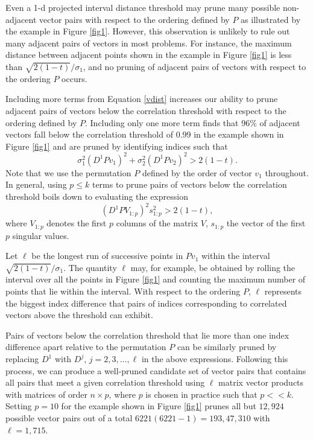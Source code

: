 \documentclass{article}
\numberwithin{algorithmctr}{section}
\begin{document}
Even a 1-d projected interval distance threshold may prune many possible
non-adjacent vector pairs with respect to the ordering defined by $P$ as
illustrated by the example in Figure \ref{fig1}.  However, this observation is
unlikely to rule out many adjacent pairs of vectors in most problems.  For
instance, the maximum distance between adjacent points shown in the example in
Figure \ref{fig1} is less than $\sqrt{2(1-t)}/\sigma_1$, and no pruning of
adjacent pairs of vectors with respect to the ordering $P$ occurs.

Including more terms from Equation \ref{vdist} increases our ability to prune
adjacent pairs of vectors below the correlation threshold with respect to the
ordering defined by $P$.  Including only one more term finds that 96\% of
adjacent vectors fall below the correlation threshold of $0.99$ in the
example shown in Figure \ref{fig1} and are pruned by identifying indices such
that
\[
\sigma_1^2 (D^1 P v_1)^2 +
\sigma_2^2 (D^1 P v_2)^2 > 2(1-t).
\]
Note that we use the permutation $P$ defined by the order of vector $v_1$
throughout.  In general, using $p\le k$ terms to prune pairs of vectors
below the correlation threshold boils down to evaluating the expression
\begin{equation}\label{proj}
(D^1 P V_{1:p} )^2 s_{1:p}^2 > 2(1-t),
\end{equation}
where 
$V_{1:p}$ denotes the first $p$ columns of the
matrix $V$, $s_{1:p}$ the vector of the first $p$ singular values.

Let $\ell$ be the longest run of successive points in $P v_1$ within the
interval $\sqrt{2(1-t)}/\sigma_1$.  The quantity $\ell$ may, for example, be
obtained by rolling the interval over all the points in Figure \ref{fig1} and
counting the maximum number of points that lie within the interval.  With
respect to the ordering $P$, $\ell$ represents the biggest index difference
that pairs of indices corresponding to correlated vectors above the threshold
can exhibit.

Pairs of vectors below the correlation threshold that lie more than one index
difference apart relative to the permutation $P$ can be similarly pruned by
replacing $D^1$ with $D^j$, $j=2,3,\ldots,\ell$ in the above expressions.
Following this process, we can produce a well-pruned candidate set of vector
pairs that contains all pairs that meet a given correlation threshold using
$\ell$ matrix vector products with matrices of order $n \times p$, where $p$ is
chosen in practice such that $p<<k$. Setting $p=10$ for the example shown in
Figure \ref{fig1} prunes all but $12,924$ possible vector pairs out of a total
$6221(6221 - 1) = 193,47,310$ with $\ell=1,715$.
\end{document}
